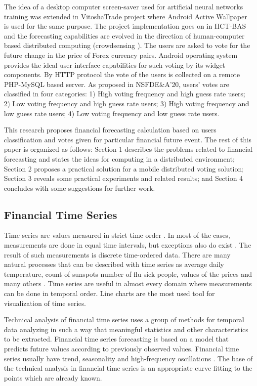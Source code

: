 \documentclass[runningheads]{llncs}
\begin{document}
The idea of a desktop computer screen-saver used for artificial neural networks training was extended in VitoshaTrade \cite{vitosha-trade-01} project where Android Active Wallpaper is used for the same purpose. The project implementation goes on in IICT-BAS and the forecasting capabilities are evolved in the direction of human-computer based distributed computing (crowdsensing \cite{crowdsensing-01}). The users are asked to vote \cite{voting-01} for the future change in the price of Forex currency pairs. Android operating system provides the ideal user interface capabilities for such voting by its widget components. By HTTP protocol the vote of the users is collected on a remote PHP-MySQL based server. As proposed in NSFDE\&A'20, users' votes are classified in four categories: 1) High voting frequency and high guess rate users; 2) Low voting frequency and high guess rate users; 3) High voting frequency and low guess rate users; 4) Low voting frequency and low guess rate users.

This research proposes financial forecasting calculation based on users classification and votes given for particular financial future event. The rest of this paper is organized as follows: Section 1 describes the problems related to financial forecasting and states the ideas for computing in a distributed environment; Section 2 proposes a practical solution for a mobile distributed voting solution; Section 3 reveals some practical experiments and related results; and Section 4 concludes with some suggestions for further work.
%
\subsection{Financial Time Series}
%
Time series are values measured in strict time order \cite{time-series-01}. In most of the cases, measurements are done in equal time intervals, but exceptions also do exist \cite{time-series-02}. The result of such measurements is discrete time-ordered data. There are many natural processes that can be described with time series as average daily temperature, count of sunspots number of flu sick people, values of the prices and many others \cite{time-series-03}. Time series are useful in almost every domain where measurements can be done in temporal order. Line charts are the most used tool for visualization of time series. 

Technical analysis of financial time series uses a group of methods for temporal data analyzing in such a way that meaningful statistics and other characteristics to be extracted. Financial time series forecasting is based on a model that predicts future values according to previously observed values. Financial time series usually have trend, seasonality and high-frequency oscillations \cite{time-series-04}. The base of the technical analysis in financial time series is an appropriate curve fitting to the points which are already known.
%
\end{document}
